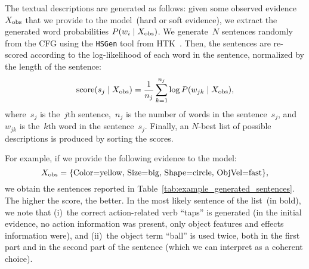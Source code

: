 The textual descriptions are generated as follows: given some observed evidence~$X_\text{obs}$ that we provide to the model~(hard or soft evidence), we extract the generated word probabilities
$P(w_i \mid X_\text{obs})$.
We generate~$N$ sentences randomly from the \ac{CFG} using the \texttt{HSGen} tool from HTK~\cite{young:htkbook}.
Then, the sentences are re-scored according to the log-likelihood of each word in the sentence, normalized by the length of the sentence:
\begin{equation} \label{eq:sentence_score}
  \text{score}(s_j \given \xobs) = \frac{1}{n_j} \sum_{k=1}^{n_j} \log P(w_{jk} \given \xobs),
\end{equation}
where~$s_j$ is the~$j$th sentence,~$n_j$ is the number of words in the sentence~$s_j$, and~$w_{jk}$ is the~$k$th word in the sentence~$s_j$.
Finally, an $N$-best list of possible descriptions is produced by sorting the scores.

For example, if we provide the following evidence to the model:
\begin{equation} \label{eq:evidence_example}
    \xobs = \{\text{Color=yellow, Size=big, Shape=circle, ObjVel=fast}\},
\end{equation}
we obtain
the sentences reported in Table~\ref{tab:example_generated_sentences}.
The higher the score, the better.
In the most likely sentence of the list~(in bold), we note that (i)~the correct action-related verb ``taps'' is generated (in the initial evidence, no action information was present, only object features and effects information were), and (ii)~the object term ``ball'' is used twice, both in the first part and in the second part of the sentence (which we can interpret as a coherent choice).


